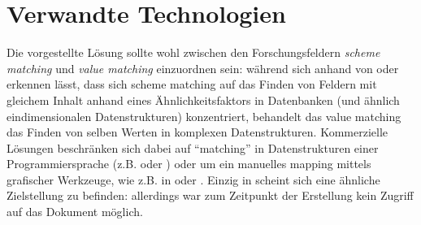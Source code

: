 \documentclass[a4paper,10pt]{article}
\begin{document}
\section{Verwandte Technologien}
Die vorgestellte Lösung sollte wohl zwischen den Forschungsfeldern \textit{scheme matching} und
\textit{value matching} einzuordnen sein: während sich anhand von \cite{rodrigues:scheme_matching_alma}
oder \cite{gou:source_xml} erkennen lässt, dass sich scheme matching auf das Finden von Feldern
mit gleichem Inhalt anhand eines Ähnlichkeitsfaktors in Datenbanken (und ähnlich eindimensionalen
Datenstrukturen) konzentriert, behandelt das value matching das Finden von selben Werten in komplexen
Datenstrukturen. Kommerzielle Lösungen beschränken sich dabei auf ``matching'' in Datenstrukturen
einer Programmiersprache (z.B. \cite{dozer:dozer} oder \cite{halterman:modelmapper}) oder um ein manuelles
mapping mittels grafischer Werkzeuge, wie z.B. in \cite{adverity:adverity} oder \cite{altova:mapforce}.\newline
Einzig in \cite{boettcher:data_mapping} scheint sich eine ähnliche Zielstellung zu befinden: allerdings war
zum Zeitpunkt der Erstellung kein Zugriff auf das Dokument möglich.
\end{document}
